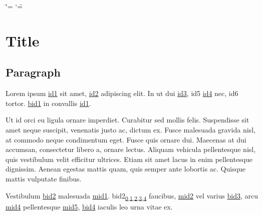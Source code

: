 

\ifdefined\shorthandoff
  \ifnum\catcode`\=\string=\active\shorthandoff{=}\fi
  \ifnum\catcode`\"=\active{}\fi
\fi

\pagestyle{empty}
\sphinxmaketitle
\pagestyle{plain}
\sphinxtableofcontents
\pagestyle{normal}
\label{\detokenize{index::doc}}


\sphinxstepscope


\chapter{Title}
\label{\detokenize{test:title}}\label{\detokenize{test::doc}}

\section{Paragraph}
\label{\detokenize{test:paragraph}}
\sphinxAtStartPar
Lorem ipsum \hyperlink{\detokenize{id1}}{id1} sit amet, \hyperlink{\detokenize{id2}}{id2} adipiscing elit. In ut dui
\hyperlink{\detokenize{id3}}{id3}, \hypertarget{\detokenize{id5}}{id5} \hyperlink{\detokenize{id4}}{id4} nec,
\hypertarget{\detokenize{id6}}{id6} tortor. \hyperlink{\detokenize{bid1}}{\hypertarget{\detokenize{bid1-ref4}}{bid1}} in convallis \hyperlink{\detokenize{id1}}{id1}.

\sphinxAtStartPar
Ut id orci eu ligula ornare imperdiet. Curabitur sed mollis felis. Suspendisse sit amet neque
suscipit, venenatis justo ac, dictum ex. Fusce malesuada gravida nisl, at commodo neque condimentum
eget. Fusce quis ornare dui. Maecenas at dui accumsan, consectetur libero a, ornare lectus. Aliquam
vehicula pellentesque nisl, quis vestibulum velit efficitur ultrices. Etiam sit amet lacus in enim
pellentesque dignissim. Aenean egestas mattis quam, quis semper ante lobortis ac. Quisque mattis
vulputate finibus.

\sphinxAtStartPar
Vestibulum \hyperlink{\detokenize{bid2}}{\hypertarget{\detokenize{bid2-ref6}}{bid2}} malesuada \hyperlink{\detokenize{test-mid1-id1}}{\hypertarget{\detokenize{test-mid1-id0}}{mid1}}.
\hypertarget{\detokenize{bid2}}{bid2}\texorpdfstring{\textsubscript{\hyperlink{\detokenize{bid2-ref6}}{0},\hyperlink{\detokenize{bid2-ref15}}{1},\hyperlink{\detokenize{bid2-ref21}}{2},\hyperlink{\detokenize{bid2-ref29}}{3},\hyperlink{\detokenize{bid2-ref39}}{4}}}{} faucibus, \hyperlink{\detokenize{test-mid2-id1}}{\hypertarget{\detokenize{test-mid2-id0}}{mid2}} vel varius \hyperlink{\detokenize{bid3}}{\hypertarget{\detokenize{bid3-ref7}}{bid3}},
arcu \hyperlink{\detokenize{test-mid4-id1}}{\hypertarget{\detokenize{test-mid4-id0}}{mid4}} pellentesque \hyperlink{\detokenize{test-mid5-id1}}{\hypertarget{\detokenize{test-mid5-id0}}{mid5}},
\hyperlink{\detokenize{bid4}}{\hypertarget{\detokenize{bid4-ref8}}{bid4}} iaculis leo urna vitae ex.

